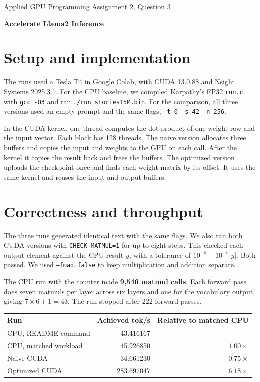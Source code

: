\documentclass[11pt,a4paper]{article}
\begin{document}
{\small\color{courseblue}Applied GPU Programming \enspace\textbullet\enspace Assignment 2, Question 3}\par
{\LARGE\bfseries Accelerate Llama2 Inference}\par
\smallskip

\section{Setup and implementation}

The runs used a Tesla T4 in Google Colab, with CUDA 13.0.88 and Nsight
Systems 2025.3.1. For the CPU baseline, we compiled Karpathy's FP32
\texttt{run.c} with \texttt{gcc -O3} and ran \texttt{./run stories15M.bin}.
For the comparison, all three versions used an empty prompt and the same
flags, \texttt{-t 0 -s 42 -n 256}.

In the CUDA kernel, one thread computes the dot product of one weight row
and the input vector. Each block has 128 threads. The naive version
allocates three buffers and copies the input and weights to the GPU
on each call. After the kernel it copies the result back and frees
the buffers. The optimized version
uploads the checkpoint once and finds each weight matrix by its offset.
It uses the same kernel and reuses the input and output buffers.

\section{Correctness and throughput}

The three runs generated identical text with the same flags. We also ran
both CUDA versions with \texttt{CHECK\_MATMUL=1} for up to eight steps.
This checked each output element against the CPU result $y$, with a
tolerance of $10^{-5}+10^{-5}|y|$. Both passed. We used
\texttt{--fmad=false} to keep multiplication and addition separate.

The CPU run with the counter made \textbf{9,546 matmul calls}. Each
forward pass does seven matmuls per layer across six layers and one for
the vocabulary output, giving $7\times6+1=43$. The run stopped after
222 forward passes.

\begin{center}
\begin{tabular}{@{}lrr@{}}
\toprule
Run & Achieved tok/s & Relative to matched CPU \\
\midrule
CPU, README command & 43.416167 & --- \\
CPU, matched workload & 45.926850 & $1.00\times$ \\
Naive CUDA & 34.661230 & $0.75\times$ \\
Optimized CUDA & 283.697047 & $6.18\times$ \\
\bottomrule
\end{tabular}
\end{center}
\end{document}
